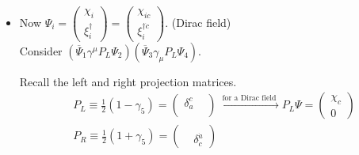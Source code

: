\documentclass[twoside]{amsart}
\begin{document}
\begin{itemize}
\[
\begin{gathered}
  ( \begin{matrix} \overline{a} & \overline{b} \end{matrix} ) \left( \begin{matrix} h \\ g \end{matrix} \right) ( \begin{matrix} \overline{e} & \overline{f} \end{matrix} ) \left( \begin{matrix} d \\ c \end{matrix} \right) = \\ 
  = (\overline{a} h + \overline{b} g )(\overline{e} d + \overline{f} c) = \overline{a} h \overline{e} d +\overline{b} g \overline{e} d + \overline{a} h \overline{e} d + \overline{b} g \overline{f} c
\end{gathered}
\]


\item[(b)] Now $\Psi_i = \left( \begin{matrix} \chi_i \\ \xi_i^{\dag} \end{matrix} \right) = \left( \begin{matrix}  \chi_{ic} \\ \xi_i^{\dag \dot{c}} \end{matrix} \right)$.  (Dirac field)  \\

Consider $(\overline{\Psi}_1 \gamma^{\mu} P_L \Psi_2)(\overline{\Psi}_3 \gamma_{\mu} P_L \Psi_4)$.  

Recall the left and right projection matrices.  
\[
\begin{aligned}
  & P_L \equiv \frac{1}{2} ( 1 - \gamma_5)   = \left( \begin{matrix} \delta_a^c & \\ & \end{matrix} \right) \xrightarrow{ \text{ for a Dirac field } } P_L \Psi = \left( \begin{matrix} \chi_c \\ 0 \end{matrix} \right) \\ 
  & P_R \equiv \frac{1}{2} ( 1 + \gamma_5 )  = \left( \begin{matrix} & \\ & \delta^{\dot{a}}_{\dot{c}} \end{matrix} \right)
\end{aligned}
\]


\end{itemize}
\end{document}
